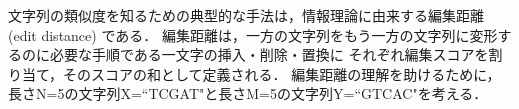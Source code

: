 文字列の類似度を知るための典型的な手法は，情報理論に由来する編集距離 (edit distance) である．
編集距離は，一方の文字列をもう一方の文字列に変形するのに必要な手順である一文字の挿入・削除・置換に
それぞれ編集スコアを割り当て，そのスコアの和として定義される．
編集距離の理解を助けるために，長さN=5の文字列X=``TCGAT"と長さM=5の文字列Y=``GTCAC"を考える．
\begin{figure}[t!]
\begin{center}
\\
\\
\subfigure[]{
}
\end{center}
\end{figure}
